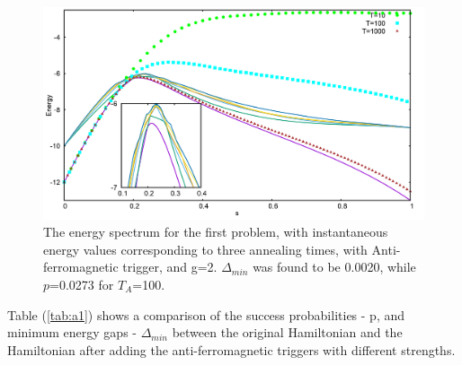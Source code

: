 \documentclass[../main.tex]{subfiles}
\begin{document}
\begin{figure}[H]
\centering 
\includegraphics[scale=0.3]{733_s12_A_g2.png}
\caption{The energy spectrum for the first problem, with instantaneous energy values corresponding to three annealing times, with Anti-ferromagnetic trigger, and g=2. $\Delta_{min}$ was found to be 0.0020, while $p$=0.0273 for $T_A$=100. }
\label{fig:a3}
\end{figure}
Table (\ref{tab:a1}) shows a comparison of the success probabilities - p, and minimum energy gaps - $\Delta_{min}$ between the original Hamiltonian and the Hamiltonian after adding the anti-ferromagnetic triggers with different strengths.
\end{document}

